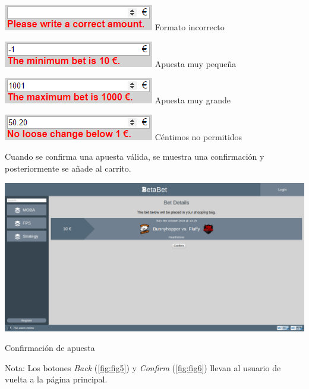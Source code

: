 \documentclass{article}
\begin{document}
\begin{multicols}{4}
    \begin{center}
        \includegraphics[width=.975\linewidth]{bet1}
        Formato incorrecto
    \end{center}
    \columnbreak
    \begin{center}
        \includegraphics[width=.975\linewidth]{bet2}
        Apuesta muy pequeña
    \end{center}
    \columnbreak
    \begin{center}
        \includegraphics[width=.975\linewidth]{bet3}
        Apuesta muy grande
    \end{center}
    \columnbreak
    \begin{center}
        \includegraphics[width=.975\linewidth]{bet4}
        Céntimos no permitidos
    \end{center}
\end{multicols}
Cuando se confirma una apuesta válida, se muestra una confirmación y posteriormente se añade al carrito.
\smallskip\newline
\begin{minipage}{\linewidth}
    \centering
    \captionsetup{type=figure}
    \includegraphics[width=\linewidth]{fig6}
    \caption{Confirmación de apuesta}
    \label{fig:fig6}
\end{minipage}
\smallskip\newline
Nota: Los botones \textit{Back} (\autoref{fig:fig5}) y \textit{Confirm} (\autoref{fig:fig6}) llevan al usuario de vuelta a la página principal.
\newpage
\end{document}
